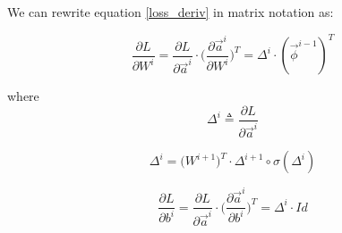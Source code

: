 We can rewrite equation \ref{loss_deriv} in matrix notation as:

\begin{equation}
 \frac{\partial L}{\partial W^i} = \frac{\partial L}{\partial \vec{a}^{i}} \cdot\Big(\frac{\partial \vec{a}^{i}}{\partial W^i}\Big)^T =
 \Delta^i \cdot (\vec{\phi}^{i-1})^T
\end{equation}

where
\begin{equation}
\Delta^i  \triangleq  \frac{\partial L}{\partial \vec{a}^{i}} 
\end{equation}

\begin{equation}
 \Delta^i = \big(W^{i+1}\big)^T \cdot \Delta^{i+1} \circ \sigma(\Delta^i)
\end{equation} 

\begin{equation}
 \frac{\partial L}{\partial b^i} = \frac{\partial L}{\partial \vec{a}^{i}} \cdot\Big(\frac{\partial \vec{a}^{i}}{\partial b^i}\Big)^T =
 \Delta^i \cdot Id
\end{equation} 
